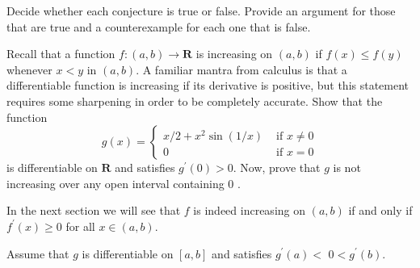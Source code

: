 \begin{exercise}
  Decide whether each conjecture is true or false. Provide an argument for those that are true and a counterexample for each one that is false.
\end{exercise}
\begin{solution}
  \TODO
\end{solution}

\begin{exercise}
  Recall that a function $f:(a, b) \rightarrow \mathbf{R}$ is increasing on $(a, b)$ if $f(x) \leq f(y)$ whenever $x<y$ in $(a, b)$. A familiar mantra from calculus is that a differentiable function is increasing if its derivative is positive, but this statement requires some sharpening in order to be completely accurate.
  Show that the function
  $$
  g(x)= \begin{cases}x / 2+x^{2} \sin (1 / x) & \text { if } x \neq 0 \\ 0 & \text { if } x=0\end{cases}
  $$
  is differentiable on $\mathbf{R}$ and satisfies $g^{\prime}(0)>0$. Now, prove that $g$ is not increasing over any open interval containing 0 .

  In the next section we will see that $f$ is indeed increasing on $(a, b)$ if and only if $f^{\prime}(x) \geq 0$ for all $x \in(a, b)$.
\end{exercise}
\begin{solution}
  \TODO
\end{solution}

\begin{exercise}
  Assume that $g$ is differentiable on $[a, b]$ and satisfies $g^{\prime}(a)<$ $0<g^{\prime}(b)$.
\end{exercise}
\begin{solution}
  \TODO
\end{solution}

